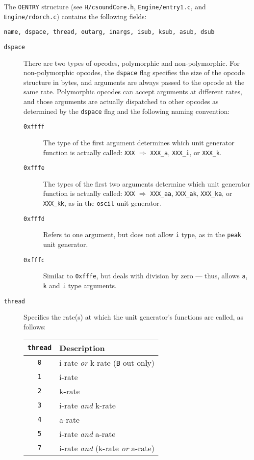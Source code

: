 \documentclass[10pt,letterpaper,onecolumn]{ltxguide}
\begin{document}
The \texttt{OENTRY} structure (see \texttt{H/csoundCore.h}, \texttt{Engine/entry1.c}, and \texttt{Engine/rdorch.c}) contains the following fields:

\begin{lstlisting}
name, dspace, thread, outarg, inargs, isub, ksub, asub, dsub
\end{lstlisting}

\begin{description}  
	\item[\texttt{dspace}] There are two types of opcodes, polymorphic and non-polymorphic. For non-polymorphic opcodes, the \texttt{dspace} flag specifies the size of the opcode structure in bytes, and arguments are always passed to the opcode at the same rate. Polymorphic opcodes can accept arguments at different rates, and those arguments are actually dispatched to other opcodes as determined by the \texttt{dspace} flag and the following naming convention:

	\begin{description}
		\item[\texttt{0xffff}] The type of the first argument determines which unit generator function is actually called: \texttt{XXX} $\Longrightarrow$ \texttt{XXX\_a}, \texttt{XXX\_i}, or \texttt{XXX\_k}.
		\item[\texttt{0xfffe}] The types of the first two arguments determine which unit generator function is actually called:  \texttt{XXX} $\Longrightarrow$ \texttt{XXX\_aa}, \texttt{XXX\_ak}, \texttt{XXX\_ka}, or \texttt{XXX\_kk}, as in the \texttt{oscil} unit generator.
		\item[\texttt{0xfffd}] Refers to one argument, but does not allow \texttt{i} type, as in the \texttt{peak} unit generator.
		\item[\texttt{0xfffc}] Similar to \texttt{0xfffe}, but deals with division by zero --- thus, allows \texttt{a}, \texttt{k} and \texttt{i} type arguments.
	\end{description}

	\item[\texttt{thread}] Specifies the rate(s) at which the unit generator's functions are called, as follows:
	
			\begin{center}
			\begin{tabular*}{280pt}[t]{cl}
			\texttt{thread} & Description \\
			\hline
			\texttt{0} & i-rate \emph{or} k-rate (\texttt{B} out only) \\
			\texttt{1} & i-rate \\
			\texttt{2} & k-rate \\
			\texttt{3} & i-rate \emph{and} k-rate\\
			\texttt{4} & a-rate \\
			\texttt{5} & i-rate \emph{and} a-rate \\
			\texttt{7} & i-rate \emph{and} (k-rate \emph{or} a-rate) \\
			\end{tabular*}
			\end{center}
	

\end{description}
\end{document}

